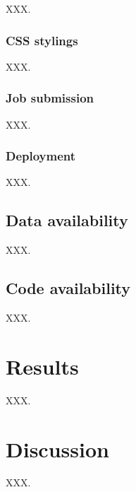 XXX.

\subsubsection{CSS stylings}

XXX.

\subsubsection{Job submission}

XXX.

\subsubsection{Deployment}

XXX.

\subsection{Data availability}

XXX.

\subsection{Code availability}

XXX.

\section{Results}

XXX.

\section{Discussion}

XXX.